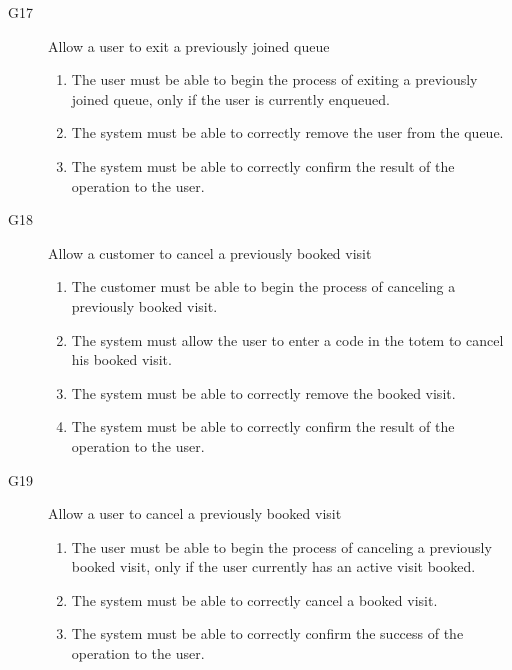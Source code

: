 \begin{description}
\begin{enumerate}[resume*]
        \end{enumerate}
    \item [G17] Allow a user to exit a previously joined queue
        \begin{enumerate}[resume*]
            \item The user must be able to begin the process of exiting a previously joined queue, only if the user is currently enqueued.
            \item The system must be able to correctly remove the user from the queue.
            \item The system must be able to correctly confirm the result of the operation to the user.
        \end{enumerate}
    \item [G18] Allow a customer to cancel a previously booked visit
        \begin{enumerate}[resume*]
            \item The customer must be able to begin the process of canceling a previously booked visit.
            \item The system must allow the user to enter a code in the totem to cancel his booked visit.
            \item The system must be able to correctly remove the booked visit.
            \item The system must be able to correctly confirm the result of the operation to the user.
        \end{enumerate}
    \item [G19] Allow a user to cancel a previously booked visit
        \begin{enumerate}[resume*]
            \item The user must be able to begin the process of canceling a previously booked visit, only if the user currently has an active visit booked.
            \item The system must be able to correctly cancel a booked visit.
            \item The system must be able to correctly confirm the success of the operation to the user.
        \end{enumerate}
\end{description}


